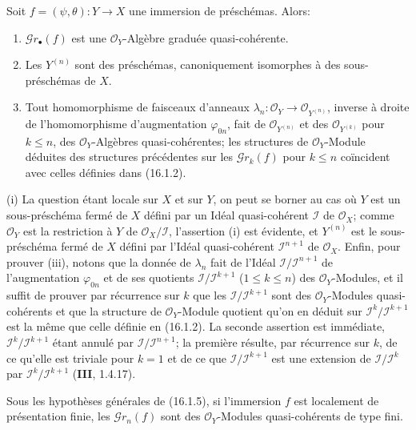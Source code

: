 \begin{proposition}[16.1.5]
Soit $f=(\psi,\theta):Y\to X$ une immersion de préschémas. Alors:
\begin{enumerate}
\item[\textup{(i)}] $\mathscr{G}r_\bullet(f)$ est une $\mathcal{O}_Y$-Algèbre graduée
quasi-cohérente.
\item[\textup{(ii)}] Les $Y^{(n)}$ sont des préschémas, canoniquement isomorphes à des
sous-préschémas de $X$.
\item[\textup{(iii)}] Tout homomorphisme de faisceaux d'anneaux
$\lambda_n:\mathcal{O}_Y\to\mathcal{O}_{Y^{(n)}}$, inverse à droite de
l'homomorphisme d'augmentation $\varphi_{0n}$, fait de
$\mathcal{O}_{Y^{(n)}}$ et des $\mathcal{O}_{Y^{(k)}}$ pour $k\leq n$, des
$\mathcal{O}_Y$-Algèbres quasi-cohérentes; les structures de
$\mathcal{O}_Y$-Module déduites des structures précédentes sur les
$\mathscr{G}r_k(f)$ pour $k\leq n$ coïncident avec celles définies dans
\textup{(16.1.2)}.
\end{enumerate}
\end{proposition}

\noindent(i) La question étant locale sur $X$ et sur $Y$, on peut se borner au cas
où $Y$ est un sous-préschéma fermé de $X$ défini par un Idéal quasi-cohérent
$\mathscr{I}$ de $\mathcal{O}_X$; comme $\mathcal{O}_Y$ est la restriction à
$Y$ de $\mathcal{O}_X/\mathscr{I}$, l'assertion (i) est évidente, et $Y^{(n)}$
est le sous-préschéma fermé de $X$ défini par l'Idéal quasi-cohérent
$\mathscr{I}^{n+1}$ de $\mathcal{O}_X$. Enfin, pour prouver (iii), notons que la
donnée de $\lambda_n$ fait de l'Idéal
$\mathscr{I}/\mathscr{I}^{n+1}$ de l'augmentation $\varphi_{0n}$ et de ses
quotients $\mathscr{I}/\mathscr{I}^{k+1}$ ($1\leq k\leq n$) des
$\mathcal{O}_Y$-Modules, et il suffit de prouver par récurrence sur $k$ que les
$\mathscr{I}/\mathscr{I}^{k+1}$ sont des $\mathcal{O}_Y$-Modules
quasi-cohérents et que la structure de $\mathcal{O}_Y$-Module quotient qu'on en
déduit sur $\mathscr{I}^k/\mathscr{I}^{k+1}$ est la même que celle définie en
(16.1.2). La seconde assertion est immédiate,
$\mathscr{I}^k/\mathscr{I}^{k+1}$ étant annulé par
$\mathscr{I}/\mathscr{I}^{n+1}$; la première résulte, par récurrence sur $k$,
de ce qu'elle est triviale pour $k=1$ et de ce que
$\mathscr{I}/\mathscr{I}^{k+1}$ est une extension de
$\mathscr{I}/\mathscr{I}^k$ par
$\mathscr{I}^k/\mathscr{I}^{k+1}$ (\textbf{III}, 1.4.17).

\begin{corollary}[16.1.6]
\label{IV.16.1.6}
Sous les hypothèses générales de \textup{(16.1.5)}, si l'immersion $f$ est localement de
présentation finie, les $\mathscr{G}r_n(f)$ sont des $\mathcal{O}_Y$-Modules
quasi-cohérents de type fini.
\end{corollary}

